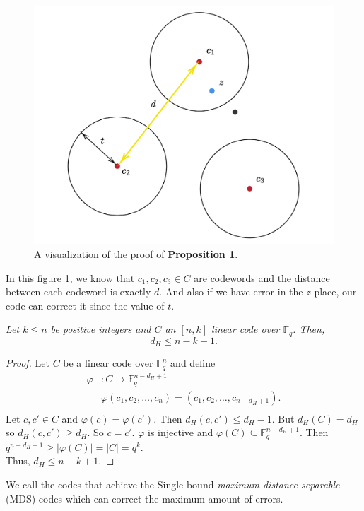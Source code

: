 \begin{figure}[h]
    \centering
    \includegraphics[scale=0.4]{balltheory.png}
    \caption{A visualization of the proof of \textbf{Proposition 1}.}
    \label{fig:ball}
\end{figure}
In this figure \ref{fig:ball}, we know that $c_1,c_2,c_3\in C$ are codewords and the distance between each codeword is exactly $d$. And also if we have error in the $z$ place, our code can correct it since the value of $t$.

\begin{theorem}
\textit{Let $k \leq n$ be positive integers and $C$ an $[n, k]$ linear code over $\mathbb{F}_q$. Then,}
\[
d_H \leq n - k + 1.
\]
\end{theorem}

\begin{proof}
    Let $C$ be a linear code over $\mathbb{F}_q^n$ and define\\
    \begin{align*}
    \varphi&: C \xrightarrow{}\mathbb{F}_q^{n-d_H+1}\\
    &\varphi(c_1, c_2, \dots,c_n) = (c_1,c_2,\dots,c_{n-d_H+1}).\\   
    \end{align*} 
    Let $c,c' \in C$ and $\varphi(c)=\varphi(c')$.
    Then $d_H(c, c') \leq d_H-1$.
    But $d_H(C)=d_H$ so $d_H(c, c') \geq d_H$. So $c = c'$. 
    $\varphi$ is injective and $\varphi(C) \subseteq \mathbb{F}_q^{n-d_H+1}$. Then $q^{n-d_H+1}\geq|\varphi(C)|=|C|=q^k$.\\
    Thus, $d_H\leq n-k+1 $.
\end{proof}
We call the codes that achieve the Single bound \textit{maximum distance separable} (MDS) codes which can correct the maximum amount of errors.

